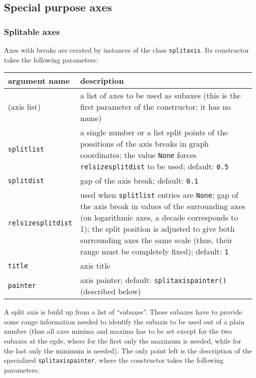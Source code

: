 \subsection{Special purpose axes}

\subsubsection{Splitable axes}

Axes with breaks are created by instances of the class
\verb|splitaxis|. Its constructor takes the following parameters:

\medskip
\begin{tabularx}{\linewidth}{l>{\raggedright\arraybackslash}X}
argument name&description\\
\hline
(axis list)&a list of axes to be used as subaxes (this is the first parameter of the constructor; it has no name)\\
\texttt{splitlist}&a single number or a list split points of the possitions of the axis breaks in graph coordinates; the value \texttt{None} forces \texttt{relsizesplitdist} to be used; default: \texttt{0.5}\\
\texttt{splitdist}&gap of the axis break; default: \texttt{0.1}\\
\texttt{relsizesplitdist}&used when \texttt{splitlist} entries are \texttt{None}; gap of the axis break in values of the surrounding axes (on logarithmic axes, a decade corresponds to 1); the split position is adjusted to give both surrounding axes the same scale (thus, their range must be completely fixed); default: \texttt{1}\\
\texttt{title}&axis title\\
\texttt{painter}&axis painter; default: \texttt{splitaxispainter()} (described below)\\
\end{tabularx}
\medskip

A split axis is build up from a list of ``subaxes''. Those subaxes
have to provide some range information needed to identify the subaxis
to be used out of a plain number (thus all axes minima and maxima has
to be set except for the two subaxes at the egde, where for the first
only the maximum is needed, while for the last only the minimum is
needed). The only point left is the description of the specialized
\verb|splitaxispainter|, where the constructor takes the following
parameters:

